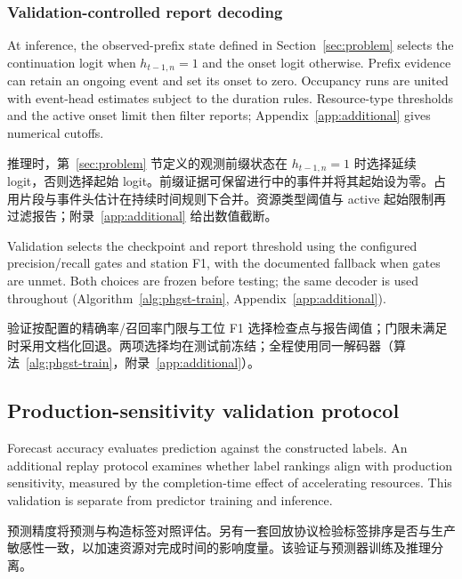 \documentclass[a4paper,fleqn]{cas-dc}
\newcommand{\zhpara}[1]{%
  \par\begingroup\small\color{black!72}\noindent #1\par\endgroup}
\begin{document}
\subsubsection{Validation-controlled report decoding}

At inference, the observed-prefix state defined in Section~\ref{sec:problem} selects the continuation logit when $h_{t-1,n}=1$ and the onset logit otherwise. Prefix evidence can retain an ongoing event and set its onset to zero. Occupancy runs are united with event-head estimates subject to the duration rules. Resource-type thresholds and the active onset limit then filter reports; Appendix~\ref{app:additional} gives numerical cutoffs.

\zhpara{推理时，第~\ref{sec:problem} 节定义的观测前缀状态在 $h_{t-1,n}=1$ 时选择延续 logit，否则选择起始 logit。前缀证据可保留进行中的事件并将其起始设为零。占用片段与事件头估计在持续时间规则下合并。资源类型阈值与 active 起始限制再过滤报告；附录~\ref{app:additional} 给出数值截断。}


Validation selects the checkpoint and report threshold using the configured precision/recall gates and station F1, with the documented fallback when gates are unmet. Both choices are frozen before testing; the same decoder is used throughout (Algorithm~\ref{alg:phgst-train}, Appendix~\ref{app:additional}).

\zhpara{验证按配置的精确率/召回率门限与工位 F1 选择检查点与报告阈值；门限未满足时采用文档化回退。两项选择均在测试前冻结；全程使用同一解码器（算法~\ref{alg:phgst-train}，附录~\ref{app:additional}）。}




\subsection{Production-sensitivity validation protocol}\label{sec:sensitivity-protocol}

Forecast accuracy evaluates prediction against the constructed labels. An additional replay protocol examines whether label rankings align with production sensitivity, measured by the completion-time effect of accelerating resources. This validation is separate from predictor training and inference.

\zhpara{预测精度将预测与构造标签对照评估。另有一套回放协议检验标签排序是否与生产敏感性一致，以加速资源对完成时间的影响度量。该验证与预测器训练及推理分离。}
\end{document}
